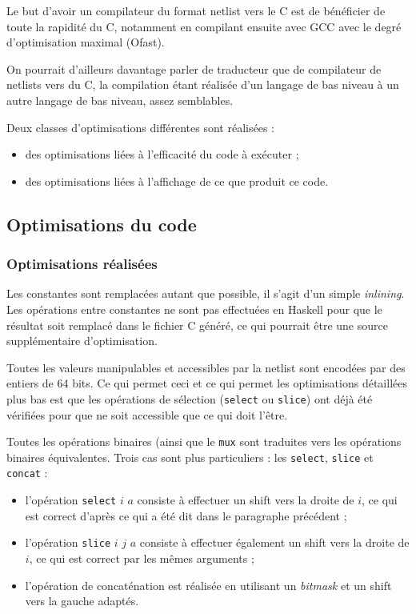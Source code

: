Le but d'avoir un compilateur du format netlist vers le C est de bénéficier de toute la rapidité du C, notamment en compilant ensuite avec GCC avec le degré d'optimisation maximal (Ofast).

On pourrait d'ailleurs davantage parler de \og traducteur \fg{} que de compilateur de netlists vers du C, la compilation étant réalisée d'un langage de bas niveau à un autre langage de bas niveau, assez semblables.

Deux classes d'optimisations différentes sont réalisées :
\begin{itemize}
\item des optimisations liées à l'efficacité du code à exécuter ;
\item des optimisations liées à l'affichage de ce que produit ce code.
\end{itemize}

\subsection{Optimisations du code}

\subsubsection{Optimisations réalisées}

Les constantes sont remplacées autant que possible, il s'agit d'un simple \textit{inlining}. Les opérations entre constantes ne sont pas effectuées en Haskell pour que le résultat soit remplacé dans le fichier C généré, ce qui pourrait être une source supplémentaire d'optimisation.

Toutes les valeurs manipulables et accessibles par la netlist sont encodées par des entiers de 64 bits.
Ce qui permet ceci et ce qui permet les optimisations détaillées plus bas est que les opérations de sélection (\texttt{select} ou \texttt{slice}) ont déjà été vérifiées pour que ne soit accessible que ce qui doit l'être.

Toutes les opérations binaires (ainsi que le \texttt{mux} sont traduites vers les opérations binaires équivalentes. Trois cas sont plus particuliers : les \texttt{select}, \texttt{slice} et \texttt{concat} :
\begin{itemize}
\item l'opération \texttt{select} $i$ $a$ consiste à effectuer un shift vers la droite de $i$, ce qui est correct d'après ce qui a été dit dans le paragraphe précédent ;
\item l'opération \texttt{slice} $i$ $j$ $a$ consiste à effectuer également un shift vers la droite de $i$, ce qui est correct par les mêmes arguments ;
\item l'opération de concaténation est réalisée en utilisant un \textit{bitmask} et un shift vers la gauche adaptés.
\end{itemize}

